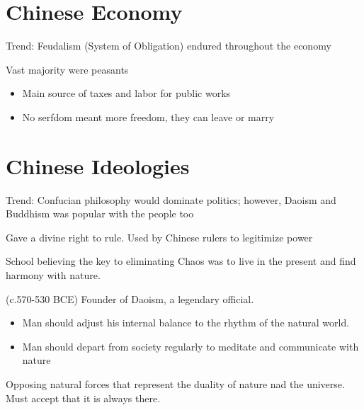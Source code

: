 \section{Chinese Economy}
Trend: Feudalism (System of Obligation) endured throughout the economy

Vast majority were peasants
\begin{itemize}
    \item Main source of taxes and labor for public works
    \item No serfdom meant more freedom, they can leave or marry
\end{itemize}

\section{Chinese Ideologies}
Trend: Confucian philosophy would dominate politics; however, Daoism and Buddhism was popular with the people too

\newcommand{\mandatedef}{Gave a divine right to rule. }
\begin{concept} \label{concept:mandate}
    \mandatedef
    Used by Chinese rulers to legitimize power
\end{concept}

\newcommand{\daoismdef}{School believing the key to eliminating Chaos was to live in the present and find harmony with nature. }
\begin{ideology} \label{ideology:daoism}
    \daoismdef
    \newcommand{\laozidef}{(c.570-530 BCE) Founder of Daoism, a legendary official.}
    \begin{person}[Laozi] \label{person:laozi}
        \laozidef
    \end{person}
    \begin{itemize}
        \item Man should adjust his internal balance to the rhythm of the natural world.
        \item Man should depart from society regularly to meditate and communicate with nature
    \end{itemize}
    \newcommand{\yinyangdef}{Opposing natural forces that represent the duality of nature nad the universe. }
    \begin{concept} \label{concept:yinyang}
        \yinyangdef
        Must accept that it is always there.
    \end{concept}
\end{ideology}

